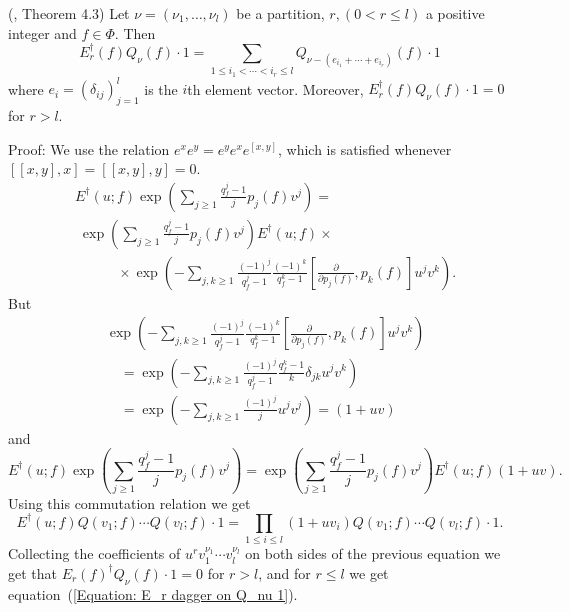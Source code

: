 \begin{dang}
    \begin{theorem}(\cite{jing2024characters}, Theorem 4.3)
        Let $\nu=(\nu_1,\dots,\nu_l)$ be a partition, $r,(0< r\leq l)$ a positive integer and $f\in \Phi$. Then 
        \begin{equation}\label{Equation: E_r dagger on Q_nu 1}
            E_r^\dagger(f) Q_\nu(f)\cdot 1= \sum_{1\leq i_1<\cdots<i_r\leq l}Q_{\nu-(e_{i_1}+\cdots+e_{i_r})}(f)\cdot1
        \end{equation}
        where $e_i=(\delta_{ij})_{j=1}^l$ is the $i$th element vector. Moreover, $E_r^\dagger(f)Q_\nu(f)\cdot1=0$ for $r>l$.
    \end{theorem}
\end{dang}
Proof: We use the relation $e^xe^y=e^ye^xe^{[x,y]}$, which is satisfied whenever $[[x,y],x]=[[x,y],y]=0$.
\begin{equation}
\begin{split}
     &E^\dagger(u;f)\exp\left(\sum_{j\geq1}\frac{q_f^j-1}{j}p_j(f)v^j\right) =\\
     &\;\exp\left(\sum_{j\geq1}\frac{q_f^j-1}{j}p_j(f)v^j\right)E^\dagger(u;f)\times\\
     &\quad\quad\quad\times\exp\left(-\sum_{j,k\geq1}\frac{(-1)^j}{q_f^j-1}\frac{(-1)^k}{q_f^k-1}\left[\frac{\partial}{\partial p_j(f)},p_k(f)\right]u^jv^k\right).
\end{split}
\end{equation}
But
\begin{equation}
    \begin{split}
        &\exp\left(-\sum_{j,k\geq1}\frac{(-1)^j}{q_f^j-1}\frac{(-1)^k}{q_f^k-1}\left[\frac{\partial}{\partial p_j(f)},p_k(f)\right]u^jv^k\right)\\
        &\quad=\exp\left(-\sum_{j,k\geq1}\frac{(-1)^j}{q_f^j-1}\frac{q_f^k-1}{k}\delta_{jk}u^jv^k\right)\\
        &\quad=\exp\left(-\sum_{j,k\geq1}\frac{(-1)^j}{j}u^jv^j\right)=(1+uv)
    \end{split}
\end{equation}
and
\begin{equation}
   E^\dagger(u;f)\exp\left(\sum_{j\geq1}\frac{q_f^j-1}{j}p_j(f)v^j\right) = \exp\left(\sum_{j\geq1}\frac{q_f^j-1}{j}p_j(f)v^j\right)E^\dagger(u;f)(1+uv).
\end{equation}
Using this commutation relation we get
\begin{equation}
    E^\dagger(u;f)Q(v_1;f)\cdots Q(v_l;f)\cdot1=\prod_{1\leq i\leq l}(1+uv_i) Q(v_1;f)\cdots Q(v_l;f)\cdot1.
\end{equation}
Collecting the coefficients of $u^rv_1^{\nu_1}\cdots v_l^{\nu_l}$ on both sides of the previous equation we get that $E_r(f)^\dagger Q_\nu(f)\cdot1=0$ for $r>l$, and for $r\leq l$ we get equation~(\ref{Equation: E_r dagger on Q_nu 1}).\par

